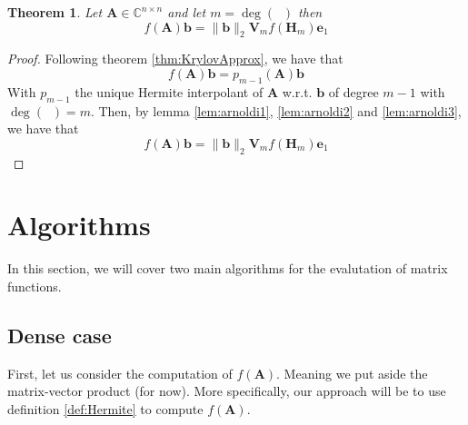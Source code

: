 \documentclass[11pt]{article}
\DeclareMathOperator{\phiAb}{\phi_{\mathbf{A},\mathbf{b}}}
\newtheorem{theorem}{Theorem}[section]
\numberwithin{equation}{section}
\begin{document}
\begin{theorem}
    Let $\mathbf{A}\in\mathbb{C}^{n\times n}$ and let $m = \deg(\phiAb)$ then
    \begin{equation}
        f(\mathbf{A})\mathbf{b} = \|\mathbf{b}\|_2\mathbf{V}_m f(\mathbf{H}_m)\mathbf{e}_1
    \end{equation}
\end{theorem}
\begin{proof}
    Following theorem \ref{thm:KrylovApprox}, we have that
    \begin{equation*}
        f(\mathbf{A})\mathbf{b} = p_{m-1}(\mathbf{A})\mathbf{b}
    \end{equation*}
    With $p_{m-1}$ the unique Hermite interpolant of $\mathbf{A}$ w.r.t. $\mathbf{b}$ of degree $m-1$ with $\deg(\phiAb)= m$. Then, by lemma \ref{lem:arnoldi1}, \ref{lem:arnoldi2} and \ref{lem:arnoldi3}, we have that
    \begin{equation*}
        f(\mathbf{A})\mathbf{b} = \|\mathbf{b}\|_2\mathbf{V}_m f(\mathbf{H}_m)\mathbf{e}_1
    \end{equation*}
\end{proof}
\section{Algorithms}
In this section, we will cover two main algorithms for the evalutation of matrix functions.
\subsection{Dense case}
First, let us consider the computation of $f(\mathbf{A})$. Meaning we put aside the matrix-vector product (for now). More specifically, our approach will be to use definition \ref{def:Hermite} to compute $f(\mathbf{A})$.
\end{document}

